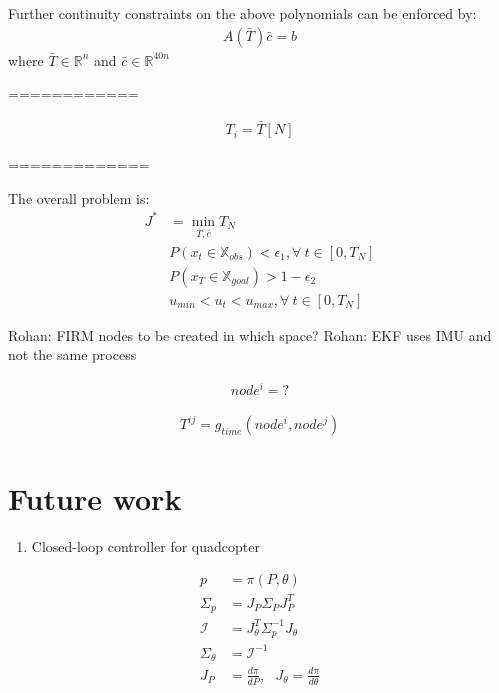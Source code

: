 \documentclass[conference]{IEEEtran}
\newcommand{\rohan}[1]{{\color{blue} Rohan: #1}}
\begin{document}
Further continuity constraints on the above polynomials can be enforced by:
\begin{align}
A(\bar{T}) \bar{c} = b    
\end{align}
where $\bar{T}\in\mathbb{R}^n$ and $\bar{c}\in \mathbb{R}^{40n}$

============

\begin{align}
T_i = \bar{T}[N]
\end{align}


=============


 The overall problem is:
\begin{align}
J^{*} &= \min_{\bar{T},\bar{c}} T_N\\
\nonumber & P(x_t\in \mathbb{X}_{obs}) < \epsilon_1, \forall~t \in [0,T_N]\\
\nonumber & P(x_T\in \mathbb{X}_{goal}) > 1-\epsilon_2 \\
\nonumber & u_{min} < u_t < u_{max}, \forall~t \in [0,T_N]
\end{align}

\rohan{FIRM nodes to be created in which space?}
\rohan{EKF uses IMU and not the same process}


\begin{align}
node^i = ?
\end{align}

\begin{align}
T^{ij} = g_{time}(node^i,node^j)
\end{align}

\section{Future work}
\begin{enumerate}
    \item Closed-loop controller for quadcopter
\end{enumerate}

\begin{align*}
p &= \pi(P,\theta) \\
\Sigma_p &= J_{P} \Sigma_P J_{P}^{T} \\ 
\mathcal{I} &= J_{\theta}^{T}\Sigma_p^{-1}J_{\theta} \\
\Sigma_{\theta} &= \mathcal{I}^{-1}\\
J_{P} &= \frac{d\pi}{dP},~~~J_{\theta} = \frac{d\pi}{d\theta} 
\end{align*}

\printbibliography
\end{document}
